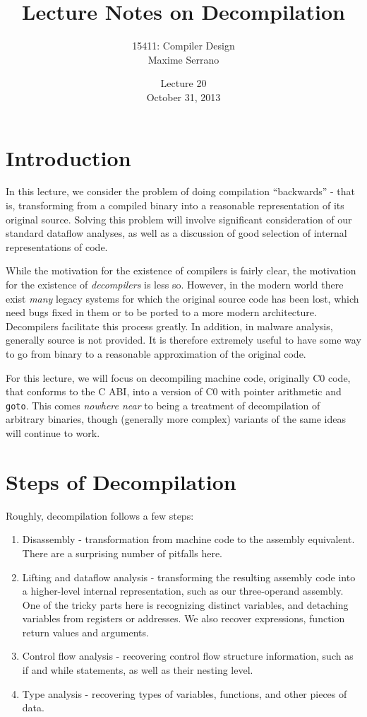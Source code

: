 \documentclass{article}
\title{Lecture Notes on Decompilation}
\author{15411: Compiler Design\\ Maxime Serrano}
\date{Lecture 20\\October 31, 2013}
\begin{document}
\maketitle
\section{Introduction}
In this lecture, we consider the problem of doing compilation ``backwards'' - that is,
transforming from a compiled binary into a reasonable representation of its original
source. Solving this problem will involve significant consideration of our standard
dataflow analyses, as well as a discussion of good selection of internal representations
of code.

While the motivation for the existence of compilers is fairly clear, the motivation
for the existence of {\em decompilers} is less so. However, in the modern world there
exist {\em many} legacy systems for which the original source code has been lost, 
which need bugs fixed in them or to be ported to a more modern architecture. Decompilers
facilitate this process greatly. In addition, in malware analysis, generally source
is not provided. It is therefore extremely useful to have some way to go from binary
to a reasonable approximation of the original code.

For this lecture, we will focus on decompiling machine code, originally C0 code,
that conforms to the C ABI, into a version of C0 with pointer arithmetic
and \verb+goto+. This comes {\em nowhere near} to being a treatment of
decompilation of arbitrary binaries, though (generally more complex) variants of
the same ideas will continue to work.

\section{Steps of Decompilation}
Roughly, decompilation follows a few steps:
\begin{enumerate}
\item Disassembly - transformation from machine code to the assembly equivalent. There
are a surprising number of pitfalls here.
\item Lifting and dataflow analysis - transforming the resulting assembly code into a
higher-level internal representation, such as our three-operand assembly. One of the
tricky parts here is recognizing distinct variables, and detaching variables from
registers or addresses. We also recover expressions, function return values and arguments.
\item Control flow analysis - recovering control flow structure information, such as
if and while statements, as well as their nesting level.
\item Type analysis - recovering types of variables, functions, and other pieces
of data.
\end{enumerate}
\end{document}
